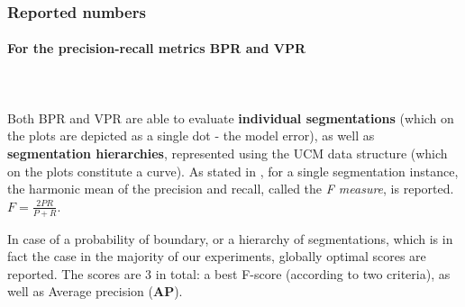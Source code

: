 
\subsubsection{Reported numbers}
\paragraph{For the precision-recall metrics BPR and VPR}\mbox{}\\\mbox{}\\
Both BPR and VPR are able to evaluate {\bf individual segmentations} (which on the plots are depicted as a single dot - the model error), as well as {\bf segmentation hierarchies}, represented using the UCM data structure (which on the plots constitute a curve). As stated in , for a single segmentation instance, the harmonic mean of the precision and recall, called the {\it F measure}, is reported. $F=\frac{2PR}{P+R}$.

In case of a probability of boundary, or a hierarchy of segmentations, which is in fact the case in the majority of our experiments, globally optimal scores %
are reported. The scores are 3 in total: a best F-score (according to two criteria), as well as Average precision (\textbf{AP}). 

